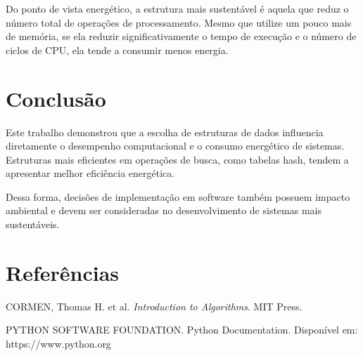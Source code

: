 \documentclass[12pt,a4paper]{article}
\begin{document}
Do ponto de vista energético, a estrutura mais sustentável é aquela que reduz o número total de operações de processamento. Mesmo que utilize um pouco mais de memória, se ela reduzir significativamente o tempo de execução e o número de ciclos de CPU, ela tende a consumir menos energia.

\section{Conclusão}

Este trabalho demonstrou que a escolha de estruturas de dados influencia diretamente o desempenho computacional e o consumo energético de sistemas. Estruturas mais eficientes em operações de busca, como tabelas hash, tendem a apresentar melhor eficiência energética.

Dessa forma, decisões de implementação em software também possuem impacto ambiental e devem ser consideradas no desenvolvimento de sistemas mais sustentáveis.

\section*{Referências}

CORMEN, Thomas H. et al. \textit{Introduction to Algorithms}. MIT Press.

PYTHON SOFTWARE FOUNDATION. Python Documentation. Disponível em: https://www.python.org
\end{document}

